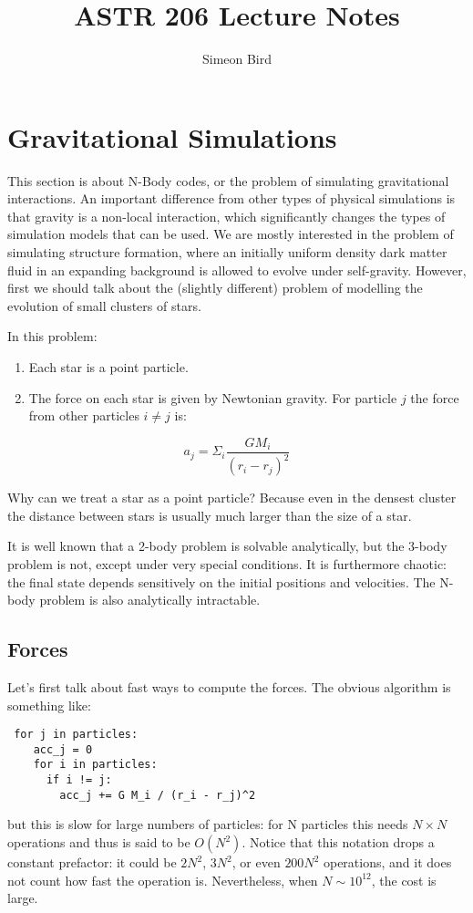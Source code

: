 \documentclass[12pt]{article}
\title{ASTR 206 Lecture Notes}
\author{Simeon Bird}
\begin{document}
\maketitle

\section{Gravitational Simulations}

This section is about N-Body codes, or the problem of simulating gravitational interactions. An important difference from other types of physical simulations is that gravity is a non-local interaction, which significantly changes the types of simulation models that can be used. We are mostly interested in the problem of simulating structure formation, where an initially uniform density dark matter fluid in an expanding background is allowed to evolve under self-gravity. However, first we should talk about the (slightly different) problem of modelling the evolution of small clusters of stars.

In this problem:

\begin{enumerate}
 \item Each star is a point particle.
 \item The force on each star is given by Newtonian gravity. For particle $j$ the force from other particles $i \neq j$ is:
\end{enumerate}
\begin{equation}
 a_j = \Sigma_i \frac{G M_i}{\left(r_i - r_j\right)^2}
\end{equation}

Why can we treat a star as a point particle? Because even in the densest cluster the distance between stars is usually much larger than the size of a star.

It is well known that a 2-body problem is solvable analytically, but the 3-body problem is not, except under very special conditions. It is furthermore chaotic: the final state depends sensitively on the initial positions and velocities. The N-body problem is also analytically intractable.

\subsection{Forces}

Let's first talk about fast ways to compute the forces. The obvious algorithm is something like:
\begin{verbatim}
 for j in particles:
    acc_j = 0
    for i in particles:
      if i != j:
        acc_j += G M_i / (r_i - r_j)^2
\end{verbatim}
but this is slow for large numbers of particles: for N particles this needs $N \times N$ operations and thus is said to be $O(N^2)$. Notice that this notation drops a constant prefactor: it could be $2 N^2$, $3 N^2$, or even $200 N^2$ operations, and it does not count how fast the operation is. Nevertheless, when $N \sim 10^{12}$, the cost is large.
\end{document}
